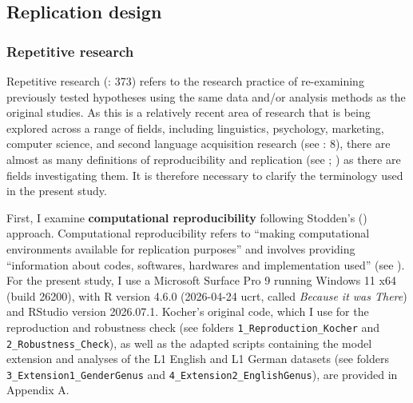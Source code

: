 \documentclass[
  letterpaper,
  DIV=11,
  numbers=noendperiod]{scrartcl}
\begin{document}
\subsection{Replication design}\label{sec-replication-design}

\subsubsection{Repetitive research}\label{sec-repetitive-research}

Repetitive research (: 373)
refers to the research practice of re-examining previously tested
hypotheses using the same data and/or analysis methods as the original
studies. As this is a relatively recent area of research that is being
explored across a range of fields, including linguistics, psychology,
marketing, computer science, and second language acquisition research
(see : 8), there are
almost as many definitions of reproducibility and replication (see
;
) as there are fields investigating
them. It is therefore necessary to clarify the terminology used in the
present study.

First, I examine \textbf{computational reproducibility} following
Stodden's () approach. Computational
reproducibility refers to ``making computational environments available
for replication purposes'' and involves providing ``information about
codes, softwares, hardwares and implementation used'' (see
). For the present study, I use a Microsoft Surface Pro 9 running
Windows 11 x64 (build 26200), with R version 4.6.0 (2026-04-24 ucrt,
called \emph{Because it was There}) and RStudio version 2026.07.1.
Kocher's original code, which I use for the reproduction and robustness
check (see folders \texttt{1\_Reproduction\_Kocher} and
\texttt{2\_Robustness\_Check}), as well as the adapted scripts
containing the model extension and analyses of the L1 English and L1
German datasets (see folders \texttt{3\_Extension1\_GenderGenus} and
\texttt{4\_Extension2\_EnglishGenus}), are provided in Appendix A.
\end{document}
